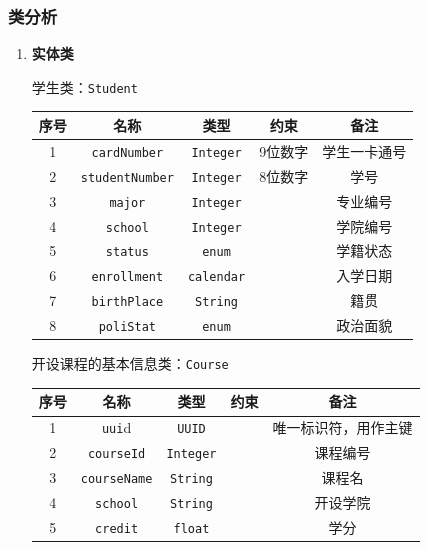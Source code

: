 \documentclass{article}
\begin{document}
\newpage

\subsubsection{类分析}

\begin{enumerate}
\item \textbf{实体类}

学生类：\texttt{Student}
\begin{table}[H]
   \centering
    \begin{tabular}{ccccc}
    \hline
    序号&名称    & 类型    & 约束    & 备注 \\
    \hline
    1&\texttt{cardNumber} & \texttt{Integer}   & 9位数字  & 学生一卡通号 \\
    2&\texttt{studentNumber} & \texttt{Integer}   & 8位数字  & 学号 \\
    3&\texttt{major} & \texttt{Integer}   &  & 专业编号 \\
    4&\texttt{school} & \texttt{Integer}   &  & 学院编号 \\
    5&\texttt{status} & \texttt{enum}   &  & 学籍状态 \\
    6&\texttt{enrollment} & \texttt{calendar}   &  & 入学日期 \\
    7&\texttt{birthPlace} & \texttt{String}   &  & 籍贯 \\
    8&\texttt{poliStat} & \texttt{enum}   &  & 政治面貌 \\
    \hline
    \end{tabular}%
\end{table}

开设课程的基本信息类：\texttt{Course}
\begin{table}[H]
  \centering
    \begin{tabular}{ccccc}
    \hline
    序号&名称    & 类型    & 约束    & 备注 \\
    \hline
    1&\texttt{uui}d  & \texttt{UUID}  &       & 唯一标识符，用作主键 \\
    2&\texttt{courseId} & \texttt{Integer}   &  & 课程编号 \\
    3&\texttt{courseName} & \texttt{String} &       & 课程名 \\
    4&\texttt{school} & \texttt{String} &       & 开设学院 \\
    5&\texttt{credit} & \texttt{float} &       & 学分 \\
    \hline
    \end{tabular}%
\end{table}%


\end{enumerate}
\end{document}
